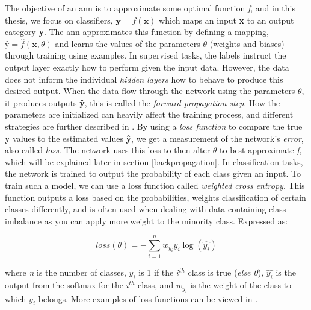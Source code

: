    The objective of an \gls{ann} is to approximate some optimal function \textit{f}, and in this thesis, we focus on classifiers, $\textbf{y} = f(\textbf{x})$ which maps an input \textbf{x} to an output category \textbf{y}. The \gls{ann} approximates this function by defining a mapping, $\textbf{\^{y}} = \hat{f}(\textbf{x},\theta)$ and learns the values of the parameters \textit{$\theta$} (weights and biases) through training using examples. In supervised tasks, the labels instruct the output layer exactly how to perform given the input data. However, the data does not inform the individual \textit{hidden layers} how to behave to produce this desired output. When the data flow through the network using the parameters $\theta$, it produces outputs \textbf{\^{y}}, this is called the \textit{forward-propagation step}. How the parameters are initialized can heavily affect the training process, and different strategies are further described in \citeauthor{Goodfellow-et-al-2016_param_init}\cite{Goodfellow-et-al-2016_param_init}. By using a \textit{loss function} to compare the true \textbf{y} values to the estimated values \textbf{\^{y}}, we get a measurement of the network's \textit{error}, also called \textit{loss}. The network uses this loss to then alter $\theta$ to best approximate \textit{f}, which will be explained later in section \ref{backpropagation}. In classification tasks, the network is trained to output the probability of each class given an input\cite{ho2019real_weighted_cross_entropy}. To train such a model, we can use a loss function called \textit{weighted cross entropy}. This function outputs a loss based on the probabilities, weights classification of certain classes differently, and is often used when dealing with data containing class imbalance as you can apply more weight to the minority class. Expressed as:
    
        \begin{equation} \label{cross_entropy}
            loss(\theta) = - \sum^{n}_{i=1} w_{y_{i}}y_{i}\log(\hat{y_{i}})
        \end{equation}
    
    where \textit{n} is the number of classes, $y_{i}$ is 1 if the $i^{th}$ class is true (\textit{else 0}), $\hat{y_{i}}$ is the output from the softmax for the $i^{th}$ class, and $w_{y_{i}}$ is the weight of the class to which $y_{i}$ belongs. More examples of loss functions can be viewed in \citeauthor{mishra2017deep}\cite{mishra2017deep}.
    


